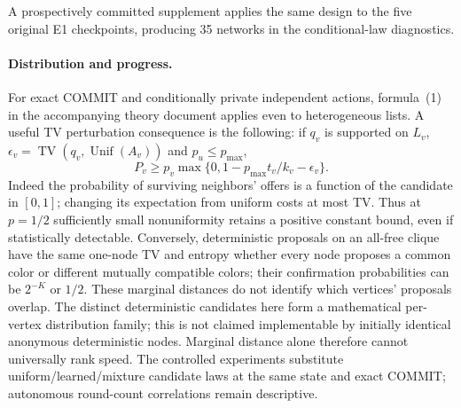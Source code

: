 A prospectively committed supplement applies the same design to the five
original E1 checkpoints, producing 35 networks in the conditional-law diagnostics.

\paragraph{Distribution and progress.}
For exact COMMIT and conditionally private independent actions, formula~(1) in
the accompanying theory document applies even to heterogeneous lists. A useful
TV perturbation consequence is the following: if $q_v$ is supported on $L_v$,
$\epsilon_v=\operatorname{TV}(q_v,\operatorname{Unif}(A_v))$ and $p_u\le p_{\max}$,
\[
 P_v\ge p_v\max\{0,1-p_{\max}t_v/k_v-\epsilon_v\}.
\]
Indeed the probability of surviving neighbors' offers is a function of the
candidate in $[0,1]$; changing its expectation from uniform costs at most TV.
Thus at $p=1/2$ sufficiently small nonuniformity retains a positive constant
bound, even if statistically detectable. Conversely, deterministic proposals
on an all-free clique have the same one-node TV and entropy whether every
node proposes a common color or different mutually compatible colors; their
confirmation probabilities can be $2^{-K}$ or $1/2$. These marginal distances
do not identify which vertices' proposals overlap. The distinct deterministic
candidates here form a mathematical per-vertex distribution family; this is
not claimed implementable by initially identical anonymous deterministic nodes.
Marginal distance alone
therefore cannot universally rank speed. The controlled experiments substitute
uniform/learned/mixture candidate laws at the same state and exact COMMIT;
autonomous round-count correlations remain descriptive.
